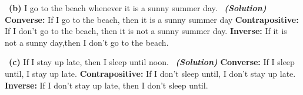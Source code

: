 \documentclass[a4 paper]{article}
\numberwithin{equation}{section}
\newcommand{\subproblem}[1]{~\newline\textbf{(#1)}}
\newcommand{\solution}{~\newline\textbf{\textit{(Solution)}} }
\newcommand{\0}{\mathbf{0}}
\begin{document}
\subproblem{b} I go to the beach whenever it is a sunny summer day.
\solution
\newline
\newline
\textbf{Converse:} If I go to the beach, then it is a sunny summer day
\newline
\newline
\textbf{Contrapositive:} If I don't go to the beach, then it is not a sunny summer day.
\newline
\newline
\textbf{Inverse:} If it is not a sunny day,then I don't go to the beach.
\newline
\newline
\newline
\newline
\newline


\subproblem{c} If I stay up late, then I sleep until
noon.
\solution
\newline
\newline
\textbf{Converse:} If I sleep until, I stay up late.
\newline
\newline
\textbf{Contrapositive:} If I don't sleep until, I don't stay up late.
\newline
\newline
\textbf{Inverse:} If I don't stay up late, then I don't sleep until.
\newline
\newline
\end{document}
